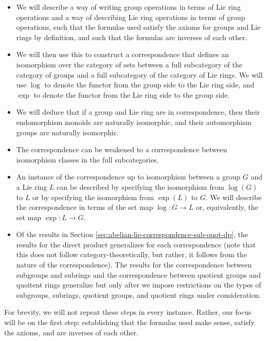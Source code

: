 \begin{itemize}
\item We will describe a way of writing group operations in terms of
  Lie ring operations and a way of describing Lie ring operations in
  terms of group operations, such that the formulas used satisfy the
  axioms for groups and Lie rings by definition, and such that the
  formulas are inverses of each other.
\item We will then use this to construct a correspondence that defines
  an isomorphism over the category of sets between a full subcategory
  of the category of groups and a full subcategory of the category of
  Lie rings. We will use $\log$ to denote the functor from the group
  side to the Lie ring side, and $\exp$ to denote the functor from the
  Lie ring side to the group side.
\item We will deduce that if a group and Lie ring are in
  correspondence, then their endomorphism monoids are naturally
  isomorphic, and their automorphism groups are naturally isomorphic.
\item The correspondence can be weakened to a correspondence between
  isomorphism classes in the full subcategories.
\item An instance of the correspondence up to isomorphism between a
  group $G$ and a Lie ring $L$ can be described by specifying the
  isomorphism from $\log(G)$ to $L$ or by specifying the isomorphism
  from $\exp(L)$ to $G$. We will describe the correspondence in terms
  of the set map $\log:G \to L$ or, equivalently, the set map $\exp:L
  \to G$.
\item Of the results in Section
  \ref{sec:abelian-lie-correspondence-sub-quot-dp}, the results for
  the direct product generalizes for each correspondence (note that
  this does not follow category-theoretically, but rather, it follows
  from the nature of the correspondence). The results for the
  correspondence between subgroups and subrings and the correspondence
  between quotient groups and quoitent rings generalize but only after
  we impose restrictions on the types of subgroups, subrings, quotient
  groups, and quotient rings under consideration.
\end{itemize}

For brevity, we will not repeat these steps in every instance. Rather,
our focus will be on the first step: establishing that the formulas
used make sense, satisfy the axioms, and are inverses of each other.
